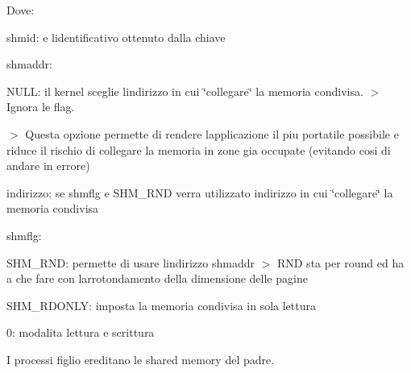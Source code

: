 Dove\+:
\begin{DoxyItemize}
\item {\ttfamily shmid}\+: e\textquotesingle{} l\textquotesingle{}identificativo ottenuto dalla chiave
\item {\ttfamily shmaddr}\+:
\begin{DoxyItemize}
\item N\+U\+LL\+: il kernel sceglie l\textquotesingle{}indirizzo in cui \char`\"{}collegare\char`\"{} la memoria condivisa. $>$ Ignora le flag.
\end{DoxyItemize}

$>$ Questa opzione permette di rendere l\textquotesingle{}applicazione il piu\textquotesingle{} portatile possibile e riduce il rischio di collegare la memoria in zone gia\textquotesingle{} occupate (evitando cosi\textquotesingle{} di andare in errore)
\begin{DoxyItemize}
\item indirizzo\+: se {\ttfamily shmflg} e\textquotesingle{} {\ttfamily S\+H\+M\+\_\+\+R\+ND} verra\textquotesingle{} utilizzato indirizzo in cui \char`\"{}collegare\char`\"{} la memoria condivisa
\end{DoxyItemize}
\item {\ttfamily shmflg}\+:
\begin{DoxyItemize}
\item {\ttfamily S\+H\+M\+\_\+\+R\+ND}\+: permette di usare l\textquotesingle{}indirizzo {\ttfamily shmaddr} $>$ R\+ND sta per round ed ha a che fare con l\textquotesingle{}arrotondamento della dimensione delle pagine
\item {\ttfamily S\+H\+M\+\_\+\+R\+D\+O\+N\+LY}\+: imposta la memoria condivisa in sola lettura
\item 0\+: modalita\textquotesingle{} lettura e scrittura
\end{DoxyItemize}
\end{DoxyItemize}

I processi figlio ereditano le shared memory del padre.

